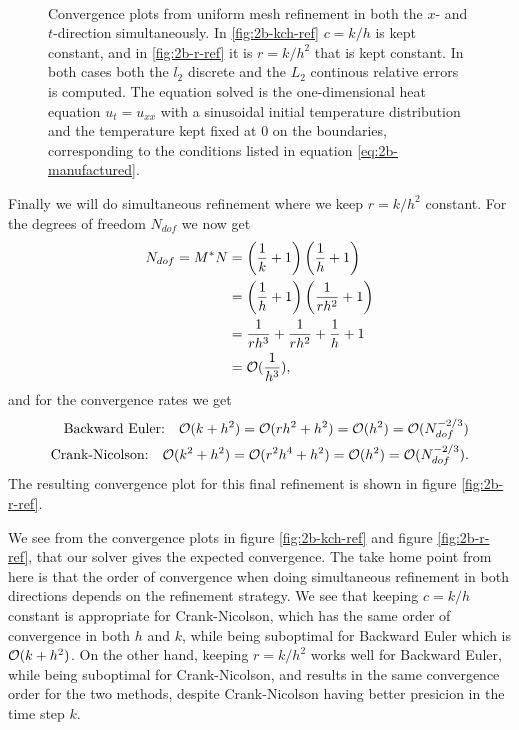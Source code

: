 \begin{figure}
    \centering
    \subfloat[Convergence plots from uniform refinement with constant $c=k/h$.]{
        
        \label{fig:2b-kch-ref}
    } \\ \medskip
    \subfloat[Convergence plots from uniform refinement with constant $r=k/h^2$.]{
        
        \label{fig:2b-r-ref}
    }
    \caption{
        Convergence plots from uniform mesh refinement in both the $x$- and $t$-direction simultaneously. 
        In \ref{fig:2b-kch-ref} $c=k/h$ is kept constant, 
        and in \ref{fig:2b-r-ref} it is $r=k/h^2$ that is kept constant. 
        In both cases 
        both the $l_2$ discrete and the $L_2$ continous relative errors is computed. 
        The equation solved is the one-dimensional heat equation $u_t=u_{xx}$ 
        with a sinusoidal initial temperature distribution and the temperature kept fixed at $0$ 
        on the boundaries, 
        corresponding to the conditions listed in equation \eqref{eq:2b-manufactured}. 
    }
    \label{fig:2b-kch-r-ref}
\end{figure}

Finally we will do simultaneous refinement where we keep $r=k/h^2$ constant. 
For the degrees of freedom $N_{dof}$ we now get 
\begin{equation*}
\begin{split}
    N_{dof} = M^* N & = \left(\frac{1}{k}+1\right)\left(\frac{1}{h}+1\right)
    \\ & = \left(\frac{1}{h}+1\right)\left(\frac{1}{rh^2}+1\right)
    \\ & = \frac{1}{rh^3} + \frac{1}{rh^2} + \frac{1}{h} + 1 
    \\ & = \mathcal{O}(\frac{1}{h^3}), 
\end{split}
\end{equation*}
and for the convergence rates we get 
\begin{equation*}
\begin{split}
    \text{Backward Euler:} \quad \mathcal{O}(k+h^2) = \mathcal{O}(rh^2+h^2) = \mathcal{O}(h^2) = \mathcal{O}(N_{dof}^{-2/3})\\
    \text{Crank-Nicolson:} \quad \mathcal{O}(k^2+h^2) = \mathcal{O}(r^2 h^4+h^2) = \mathcal{O}(h^2) = \mathcal{O}(N_{dof}^{-2/3}). 
\end{split}
\end{equation*}
The resulting convergence plot for this final refinement is shown in figure \ref{fig:2b-r-ref}. 

We see from the convergence plots in figure \ref{fig:2b-kch-ref} and figure \ref{fig:2b-r-ref}, 
that our solver gives the expected convergence. 
The take home point from here is that the order of convergence when doing simultaneous refinement in both directions depends on the refinement strategy. 
We see that keeping $c=k/h$ constant is appropriate for Crank-Nicolson, 
which has the same order of convergence in both $h$ and $k$, 
while being suboptimal for Backward Euler which is $\mathcal{O}(k + h^2)$. 
On the other hand, keeping $r=k/h^2$ works well for Backward Euler, 
while being suboptimal for Crank-Nicolson, 
and results in the same convergence order for the two methods, 
despite Crank-Nicolson having better presicion in the time step $k$. 

